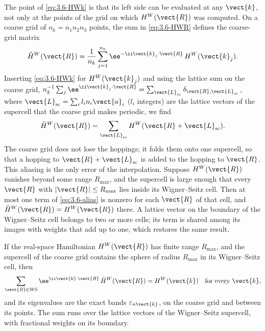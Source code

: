 The point of \cref{eq:3.6-HWk} is that its left side can be evaluated at any $\vect{k}$, not only at the points of the grid on which $H^W(\vect{R})$ was computed. On a coarse grid of $n_k = n_1n_2n_3$ points, the sum in \cref{eq:3.6-HWR} defines the coarse-grid matrix
\begin{equation*}
  \tilde H^W(\vect{R}) = \frac{1}{n_k}\sum_{j=1}^{n_k}\ee^{-\ii\vect{k}_j\cdot\vect{R}}\,H^W(\vect{k}_j) .
\end{equation*}
Inserting \cref{eq:3.6-HWk} for $H^W(\vect{k}_j)$ and using the lattice sum on the coarse grid, $n_k^{-1}\sum_j\ee^{\ii\vect{k}_j\cdot\vect{R}} = \sum_{\vect{L}_{\mathrm{sc}}}\delta_{\vect{R},\vect{L}_{\mathrm{sc}}}$, where $\vect{L}_{\mathrm{sc}} = \sum_i l_i n_i\vect{a}_i$ ($l_i$ integers) are the lattice vectors of the supercell that the coarse grid makes periodic, we find
\begin{equation}
  \tilde H^W(\vect{R}) = \sum_{\vect{L}_{\mathrm{sc}}}H^W(\vect{R} + \vect{L}_{\mathrm{sc}}) .
  \label{eq:3.6-alias}
\end{equation}
The coarse grid does not lose the hoppings; it folds them onto one supercell, so that a hopping to $\vect{R} + \vect{L}_{\mathrm{sc}}$ is added to the hopping to $\vect{R}$. This aliasing is the only error of the interpolation. Suppose $H^W(\vect{R})$ vanishes beyond some range $R_{\mathrm{max}}$, and the supercell is large enough that every $\vect{R}$ with $|\vect{R}| \le R_{\mathrm{max}}$ lies inside its Wigner--Seitz cell. Then at most one term of \cref{eq:3.6-alias} is nonzero for each $\vect{R}$ of that cell, and $\tilde H^W(\vect{R}) = H^W(\vect{R})$ there. A lattice vector on the boundary of the Wigner--Seitz cell belongs to two or more cells; its term is shared among its images with weights that add up to one, which restores the same result.
\begin{keyresult}
If the real-space Hamiltonian $H^W(\vect{R})$ has finite range $R_{\mathrm{max}}$, and the supercell of the coarse grid contains the sphere of radius $R_{\mathrm{max}}$ in its Wigner--Seitz cell, then
\begin{equation}
  \sum_{\vect{R}\in\mathrm{WS}}\ee^{\ii\vect{k}\cdot\vect{R}}\,\tilde H^W(\vect{R}) = H^W(\vect{k}) \quad\text{for every }\vect{k},
  \label{eq:3.6-exact}
\end{equation}
and its eigenvalues are the exact bands $\varepsilon_{n\vect{k}}$, on the coarse grid and between its points. The sum runs over the lattice vectors of the Wigner--Seitz supercell, with fractional weights on its boundary.
\end{keyresult}
